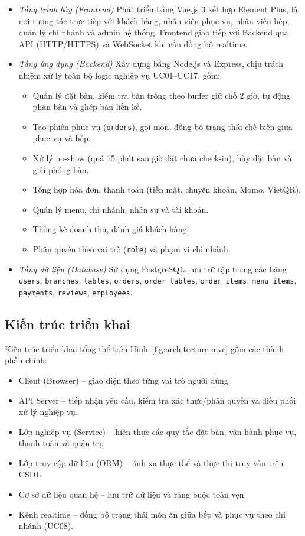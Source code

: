 \documentclass[../DoAn.tex]{subfiles}
\begin{document}
\begin{itemize}
    \item \textit{Tầng trình bày (Frontend)}
    Phát triển bằng Vue.js 3 kết hợp Element Plus, là nơi tương tác trực tiếp với khách hàng, nhân viên phục vụ, nhân viên bếp, quản lý chi nhánh và admin hệ thống.
    Frontend giao tiếp với Backend qua API (HTTP/HTTPS) và WebSocket khi cần đồng bộ realtime.

    \item \textit{Tầng ứng dụng (Backend)}
    Xây dựng bằng Node.js và Express, chịu trách nhiệm xử lý toàn bộ logic nghiệp vụ UC01--UC17, gồm:
    \begin{itemize}
        \item Quản lý đặt bàn, kiểm tra bàn trống theo buffer giữ chỗ 2 giờ, tự động phân bàn và ghép bàn liền kề.
        \item Tạo phiên phục vụ (\texttt{orders}), gọi món, đồng bộ trạng thái chế biến giữa phục vụ và bếp.
        \item Xử lý no-show (quá 15 phút sau giờ đặt chưa check-in), hủy đặt bàn và giải phóng bàn.
        \item Tổng hợp hóa đơn, thanh toán (tiền mặt, chuyển khoản, Momo, VietQR).
        \item Quản lý menu, chi nhánh, nhân sự và tài khoản.
        \item Thống kê doanh thu, đánh giá khách hàng.
        \item Phân quyền theo vai trò (\texttt{role}) và phạm vi chi nhánh.
    \end{itemize}

    \item \textit{Tầng dữ liệu (Database)}
    Sử dụng PostgreSQL, lưu trữ tập trung các bảng \texttt{users}, \texttt{branches}, \texttt{tables}, \texttt{orders},
    \texttt{order\_tables}, \texttt{order\_items}, \texttt{menu\_items}, \texttt{payments}, \texttt{reviews}, \texttt{employees}.
\end{itemize}

\subsection{Kiến trúc triển khai}

Kiến trúc triển khai tổng thể trên Hình~\ref{fig:architecture-mvc} gồm các thành phần chính:

\begin{itemize}
    \item Client (Browser) -- giao diện theo từng vai trò người dùng.
    \item API Server -- tiếp nhận yêu cầu, kiểm tra xác thực/phân quyền và điều phối xử lý nghiệp vụ.
    \item Lớp nghiệp vụ (Service) -- hiện thực các quy tắc đặt bàn, vận hành phục vụ, thanh toán và quản trị.
    \item Lớp truy cập dữ liệu (ORM) -- ánh xạ thực thể và thực thi truy vấn trên CSDL.
    \item Cơ sở dữ liệu quan hệ -- lưu trữ dữ liệu và ràng buộc toàn vẹn.
    \item Kênh realtime -- đồng bộ trạng thái món ăn giữa bếp và phục vụ theo chi nhánh (UC08).
\end{itemize}
\end{document}
